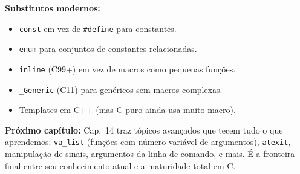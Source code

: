 \documentclass[12pt,a4paper]{article}
\begin{document}
\begin{tcolorbox}[colback=deitellightblue,colframe=deitelblue,
  title={\bfseries O pré-processador: ferramenta de duas faces}]
\textbf{Substitutos modernos:}
\begin{itemize}[noitemsep]
  \item \texttt{const} em vez de \texttt{\#define} para constantes.
  \item \texttt{enum} para conjuntos de constantes relacionadas.
  \item \texttt{inline} (C99+) em vez de macros como pequenas funções.
  \item \texttt{\_Generic} (C11) para genéricos sem macros complexas.
  \item Templates em C++ (mas C puro ainda usa muito macro).
\end{itemize}

\textbf{Próximo capítulo:} Cap.~14 traz tópicos avançados que tecem tudo o
que aprendemos: \texttt{va\_list} (funções com número variável de argumentos),
\texttt{atexit}, manipulação de sinais, argumentos da linha de comando, e
mais. É a fronteira final entre seu conhecimento atual e a maturidade total
em C.

\end{tcolorbox}
\end{document}
